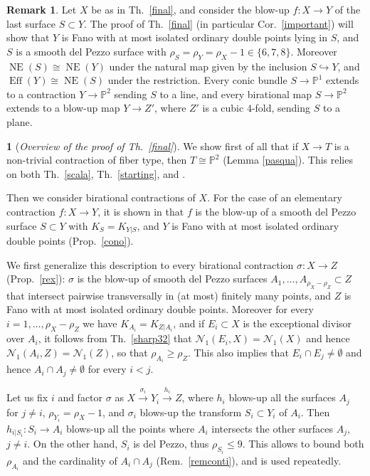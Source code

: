 \documentclass[a4paper,12pt]{amsart}
\theoremstyle{definition}
\newtheorem{remark}[thm]{Remark}
\newtheorem{prg}[thm]{}
\numberwithin{figure}{section}
\numberwithin{table}{section}
\newcommand{\pr}{\mathbb{P}}
\newcommand{\N}{\mathcal{N}_1}
\newcommand{\NE}{\operatorname{NE}}
\newcommand{\Eff}{\operatorname{Eff}}
\begin{document}
\begin{remark}\label{conescubic}
  Let $X$ be as in Th.~\ref{final}, and consider   the blow-up $f\colon X\to Y$ of the last surface $S\subset Y$. The proof of Th.~\ref{final}  (in particular Cor.~\ref{important}) will show that $Y$ is Fano with at most isolated ordinary double points lying in $S$, and $S$ is a smooth del Pezzo surface with $\rho_S=\rho_Y=\rho_X-1\in\{6,7,8\}$. Moreover $\NE(S)\cong\NE(Y)$ under the natural map given by the inclusion $S\hookrightarrow Y$, and $\Eff(Y)\cong \NE(S)$ under the restriction. Every conic bundle $S\to\pr^1$ extends to a contraction $Y\to\pr^2$ sending $S$ to a line, and every birational map $S\to\pr^2$ extends to a blow-up map $Y\to Z'$, where $Z'$ is a cubic $4$-fold, sending $S$ to a plane.
\end{remark}  
\begin{prg}[\em Overview of the proof of Th.~\ref{final}]\label{overviewfinal}
  We show first of all that if $X\to T$ is a non-trivial contraction of fiber type, then $T\cong\pr^2$ (Lemma \ref{pasqua}). This relies on both Th.~\ref{scala}, Th.~\ref{starting}, and \cite{3folds}.

  Then we consider birational contractions of $X$.
For the case of an elementary contraction $f\colon X\to Y$,
  it is shown in \cite{32} that $f$ is  the blow-up of a smooth del Pezzo surface $S\subset Y$ with $K_S=K_{Y|S}$, and $Y$ is Fano with at most isolated ordinary double points (Prop.~\ref{cono}). 

  We first generalize this description to every birational contraction $\sigma\colon X\to Z$ (Prop.~\ref{rex}): $\sigma$ is the blow-up of smooth del Pezzo surfaces $A_1,\dotsc,A_{\rho_X-\rho_Z}\subset Z$ that intersect pairwise transversally 
in (at most) finitely many points,  and $Z$ is Fano with at most isolated ordinary double points. Moreover for every $i=1,\dotsc,\rho_X-\rho_Z$  we have
  $K_{A_i}=K_{Z|A_i}$,
  and if $E_i\subset X$ is the exceptional divisor over $A_i$,
  it follows from Th.~\ref{sharp32} that $\N(E_i,X)=\N(X)$ and hence $\N(A_i,Z)=\N(Z)$, so that $\rho_{A_i}\geq\rho_Z$. This also implies that $E_i\cap E_j\neq\emptyset$ and hence $A_i\cap A_j\neq\emptyset$ for every $i<j$. 

  Let us fix $i$ and factor $\sigma$ as $X\stackrel{\sigma_i}{\to} Y_i\stackrel{h_i}{\to}Z$, where $h_i$ blows-up all the surfaces $A_j$ for $j\neq i$, $\rho_{Y_i}=\rho_X-1$, and $\sigma_i$ blows-up the transform $S_i\subset Y_i$ of $A_i$. Then $h_{i|S_i}\colon S_i\to A_i$ blows-up all the points where $A_i$ intersects the other surfaces $A_j$, $j\neq i$. On the other hand, $S_i$ is del Pezzo, thus $\rho_{S_i}\leq 9$. This allows to bound both $\rho_{A_i}$ and the cardinality of $A_i\cap A_j$ (Rem.~\ref{remconti}), and is used repeatedly.


\end{prg}
\end{document}
